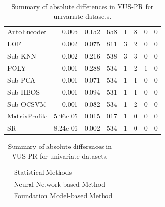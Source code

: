 \documentclass[12pt,oneside]{article}
\begin{document}
\begin{table}[htbp]
\begin{tabular}{lrrrrrrr}
        \rowcolor{myLightBlue} AutoEncoder & 0.006 & 0.152 & 658 & 1 & 8 & 0 & 0 \\
        \rowcolor{lightgray} LOF & 0.002 & 0.075 & 811 & 3 & 2 & 0 & 0 \\
        \rowcolor{lightgray} Sub-KNN & 0.002 & 0.216 & 538 & 3 & 3 & 0 & 0 \\
        \rowcolor{lightgray} POLY & 0.001 & 0.288 & 534 & 1 & 2 & 1 & 0 \\
        \rowcolor{lightgray} Sub-PCA & 0.001 & 0.071 & 534 & 1 & 1 & 0 & 0 \\
        \rowcolor{lightgray} Sub-HBOS & 0.001 & 0.094 & 531 & 1 & 1 & 0 & 0 \\
        \rowcolor{lightgray} Sub-OCSVM & 0.001 & 0.082 & 534 & 1 & 2 & 0 & 0 \\
        \rowcolor{lightgray} MatrixProfile & 5.96e-05 & 0.015 & 017 & 1 & 0 & 0 & 0 \\
        \rowcolor{lightgray} SR & 8.24e-06 & 0.002 & 534 & 1 & 0 & 0 & 0 \\
        \bottomrule
    \end{tabular}
    \par
    \vspace{1em}
    \noindent 
    \begin{tabular}{@{} p{1em} l @{}} 
        \rowcolor{lightgray} \strut & Statistical Methods \\
        \rowcolor{myLightBlue} \strut & Neural Network-based Method \\
        \rowcolor{myLightGreen} \strut & Foundation Model-based Method \\
        
    \end{tabular}
    \caption{\label{tab:Table 2} Summary of absolute differences in VUS-PR for univariate datasets.}
\end{table}
\end{document}
